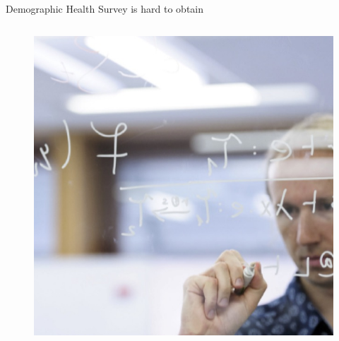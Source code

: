 \documentclass[t]{beamer}
\begin{document}
\begin{frame}{Demographic Health Survey is hard to obtain}
\begin{columns}[T,totalwidth=\textwidth]
	    \begin{column}{0.45\textwidth}
			\begin{figure}
				\vspace{-\blocktitlesize}
				\includegraphics[height=0.65\paperheight,keepaspectratio]{drawing-on-glass.jpg}
			\end{figure}
  		\end{column}
  	\end{columns}
\end{frame}
\end{document}
